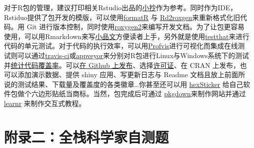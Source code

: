 \documentclass[]{tufte-book}
\begin{document}
对于R包的管理，建议打印相关Rstudio出品的\href{https://www.rstudio.com/resources/cheatsheets/}{小抄}作为参考。同时作为IDE，Rstiduo提供了包开发的模版，可以使用\href{https://yihui.name/formatr/}{formatR} 与 \href{https://cran.r-project.org/web/packages/Rd2roxygen/index.html}{Rd2roxgen}来重新格式化旧代码。用 Git 进行版本控制，同时使用\href{https://cran.r-project.org/web/packages/roxygen2/index.html}{roxygen2}来编写开发文档。为了让包更容易使用，可以用Rmarkdown来写\href{http://r-pkgs.had.co.nz/vignettes.html}{小品文}方便读者上手，另外就是使用\href{https://github.com/r-lib/testthat}{testthat}来进行代码的单元测试。对于代码的执行效率，可以用\href{https://rstudio.github.io/profvis/}{Profvis}进行可视化而集成在线测试则可以通过\href{https://travis-ci.org/}{travis-ci}或\href{https://www.appveyor.com/}{appveyor}来分别对R包进行Linux与Windows系统下的测试并\href{https://en.wikipedia.org/wiki/Code_coverage}{统计代码覆盖率}。可以\href{https://github.com/}{在 Github 上发布}、选择\href{https://zh.wikipedia.org/wiki/\%E8\%87\%AA\%E7\%94\%B1\%E5\%8F\%8A\%E9\%96\%8B\%E6\%94\%BE\%E5\%8E\%9F\%E5\%A7\%8B\%E7\%A2\%BC\%E8\%BB\%9F\%E9\%AB\%94\%E8\%A8\%B1\%E5\%8F\%AF\%E8\%AD\%89\%E6\%AF\%94\%E8\%BC\%83}{许可证}、在 CRAN 上发布，也可以添加演示数据、提供 shiny 应用、写更新日志与 Readme 文档且放上前面所说的测试结果、下载量及覆盖度的各类徽章\ldots 你甚至还可以用 \href{https://github.com/GuangchuangYu/hexSticker}{hexSticker} 给自己软件包做个六边形贴纸当商标。当然，包完成后可通过 \href{https://github.com/r-lib/pkgdown}{pkgdown}来制作网站并通过\href{https://rstudio.github.io/learnr/}{learnr} 来制作交互式教程。

\hypertarget{scitest}{%
\chapter*{附录二：全栈科学家自测题}\label{scitest}}
\end{document}
